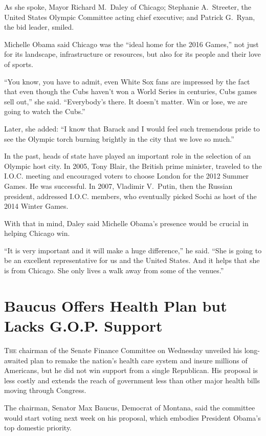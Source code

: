 ﻿\documentclass[12pt]{article}
\begin{document}
As she spoke, Mayor Richard M.~Daley of Chicago; Stephanie A.~Streeter, the United States Olympic
Committee acting chief executive; and Patrick G.~Ryan, the bid leader, smiled.

Michelle Obama said Chicago was the ``ideal home for the 2016 Games,'' not just for its landscape,
infrastructure or resources, but also for its people and their love of sports.

``You know, you have to admit, even White Sox fans are impressed by the fact that even though the
Cubs haven't won a World Series in centuries, Cubs games sell out,'' she said. ``Everybody's there.
It doesn't matter. Win or lose, we are going to watch the Cubs.''

Later, she added: ``I know that Barack and I would feel such tremendous pride to see the Olympic
torch burning brightly in the city that we love so much.''

In the past, heads of state have played an important role in the selection of an Olympic host city.
In 2005, Tony Blair, the British prime minister, traveled to the I.O.C. meeting and encouraged
voters to choose London for the 2012 Summer Games. He was successful. In 2007, Vladimir V.~Putin,
then the Russian president, addressed I.O.C. members, who eventually picked Sochi as host of the
2014 Winter Games.

With that in mind, Daley said Michelle Obama's presence would be crucial in helping Chicago win.

``It is very important and it will make a huge difference,'' he said. ``She is going to be an
excellent representative for us and the United States. And it helps that she is from Chicago. She
only lives a walk away from some of the venues.''

\section{Baucus Offers Health Plan but Lacks G.O.P. Support}

\lettrine{T}{he} chairman of the Senate Finance Committee on Wednesday unveiled his long-awaited
plan to remake the nation's health care system and insure millions of Americans, but he did not win
support from a single Republican. His proposal is less costly and extends the reach of government
less than other major health bills moving through Congress.

The chairman, Senator Max Baucus, Democrat of Montana, said the committee would start voting next
week on his proposal, which embodies President Obama's top domestic priority.
\end{document}
